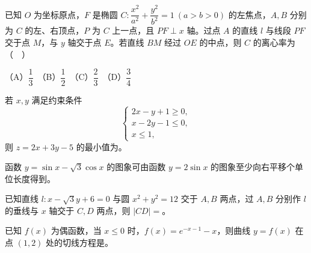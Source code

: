 \begin{question}
已知 \(O\) 为坐标原点，\(F\) 是椭圆 \(C:\dfrac{x^2}{a^2}+\dfrac{y^2}{b^2}=1\ (a>b>0)\) 的左焦点，\(A,B\) 分别为 \(C\) 的左、右顶点，\(P\) 为 \(C\) 上一点，且 \(PF\perp x\) 轴。过点 \(A\) 的直线 \(l\) 与线段 \(PF\) 交于点 \(M\)，与 \(y\) 轴交于点 \(E\)。若直线 \(BM\) 经过 \(OE\) 的中点，则 \(C\) 的离心率为（　）

（A）\(\dfrac13\)　（B）\(\dfrac12\)　（C）\(\dfrac23\)　（D）\(\dfrac34\)

\end{question}

\begin{question}
若 \(x,y\) 满足约束条件
\nopagebreak[4]
\[
\begin{cases}
2x-y+1\geq0,\\
x-2y-1\leq0,\\
x\leq1,
\end{cases}
\]
则 \(z=2x+3y-5\) 的最小值为\gkblank{}。

\end{question}
\begin{question}
函数 \(y=\sin x-\sqrt3\cos x\) 的图象可由函数 \(y=2\sin x\) 的图象至少向右平移\gkblank{}个单位长度得到。

\end{question}
\begin{question}
已知直线 \(l:x-\sqrt3y+6=0\) 与圆 \(x^2+y^2=12\) 交于 \(A,B\) 两点，过 \(A,B\) 分别作 \(l\) 的垂线与 \(x\) 轴交于 \(C,D\) 两点，则 \(|CD|=\)\gkblank{}。

\end{question}
\begin{question}
已知 \(f(x)\) 为偶函数，当 \(x\leq0\) 时，\(f(x)=e^{-x-1}-x\)，则曲线 \(y=f(x)\) 在点 \((1,2)\) 处的切线方程是\gkblank{}。

\end{question}

